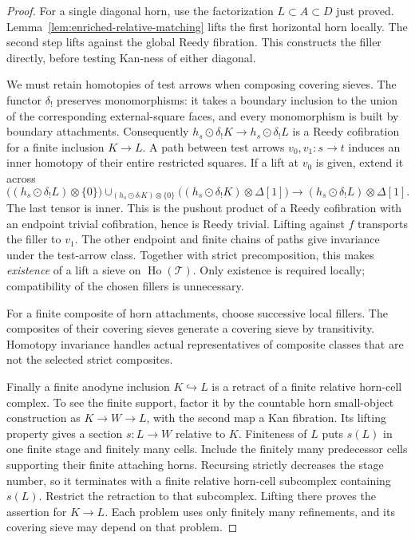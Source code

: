 \documentclass[12pt]{amsart}
\theoremstyle{definition}
\theoremstyle{remark}
\numberwithin{equation}{section}
\newcommand{\CT}{\mathcal T}
\begin{document}
\begin{proof}
For a single diagonal horn, use the factorization
$L\subset A\subset D$ just proved.
Lemma~\ref{lem:enriched-relative-matching} lifts the
first horizontal horn locally. The second step lifts
against the global Reedy fibration. This constructs
the filler directly, before testing Kan-ness of
either diagonal.

We must retain homotopies of test arrows when composing
covering sieves. The functor $\delta_!$ preserves
monomorphisms: it takes a boundary inclusion to the
union of the corresponding external-square faces, and
every monomorphism is built by boundary attachments.
Consequently $h_s\odot\delta_!K\to h_s\odot\delta_!L$
is a Reedy cofibration for a finite inclusion $K\to L$.
A path between test arrows $v_0,v_1:s\to t$ induces
an inner homotopy of their entire restricted squares.
If a lift at $v_0$ is given, extend it across
\[
 \bigl((h_s\odot\delta_!L)\otimes\{0\}\bigr)
 \mathop{\cup}_{(h_s\odot\delta_!K)\otimes\{0\}}
 \bigl((h_s\odot\delta_!K)\otimes\Delta[1]\bigr)
 \longrightarrow (h_s\odot\delta_!L)\otimes\Delta[1].
\]
The last tensor is inner. This is the pushout product
of a Reedy cofibration with an endpoint trivial
cofibration, hence is Reedy trivial. Lifting against
$f$ transports the filler to $v_1$. The other endpoint
and finite chains of paths give invariance under the
test-arrow class. Together with strict precomposition,
this makes \emph{existence} of a lift a sieve on
$\operatorname{Ho}(\CT)$. Only existence is required
locally; compatibility of the chosen fillers is
unnecessary.

For a finite composite of horn attachments, choose
successive local fillers. The composites of their
covering sieves generate a covering sieve by transitivity.
Homotopy invariance handles actual representatives of
composite classes that are not the selected strict
composites.

Finally a finite anodyne inclusion $K\hookrightarrow L$
is a retract of a finite relative horn-cell complex.
To see the finite support, factor it by the countable
horn small-object construction as
$K\to W\to L$, with the second map a Kan fibration.
Its lifting property gives a section $s:L\to W$
relative to $K$. Finiteness of $L$ puts $s(L)$ in
one finite stage and finitely many cells. Include the
finitely many predecessor cells supporting their finite
attaching horns. Recursing strictly decreases the
stage number, so it terminates with a finite relative
horn-cell subcomplex containing $s(L)$. Restrict the
retraction to that subcomplex. Lifting there proves
the assertion for $K\to L$.
Each problem uses only finitely many refinements,
and its covering sieve may depend on that problem.
\end{proof}
\end{document}
